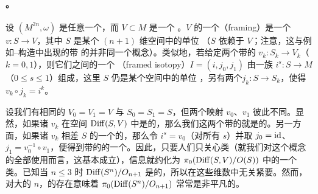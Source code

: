 \paragraph{\trFrame{}。}\label{sub:framings}
设 $(M^{2n},\omega)$ 是任意一个\trSymplectic\trManifold，而 $V\subset M$ 是一个%
\trLagrange\trSphere{}。$V$ 的一个\textbf{\trFrame}（framing）是一个%
\trDiffeomorphism{}$v\colon S\to V$，其中 $S$ 是某个 $(n+1)$ 维\trInnerProduct{}空间中的单位%
\trSphere{}（$S$ 依赖于 $V$；注意，这与例如\trPontryagin--\trThom{}构造中出现的带%
\trFrame{}的\trManifold{}并非同一个概念）。类似地，若给定两个带\trFrame{}的%
\trLagrange\trSphere{}$v_k\colon S_k\to V_k$（$k=0,1$），则它们之间的一个%
\textbf{\trFrame\trIsotopy}（framed isotopy）$I=(i,j_0,j_1)$ 由一族\trLagrange\trEmbedding{}%
$i^s\colon S\to M$（$0\le s\le 1$）组成，这里 $S$ 仍是某个\trInnerProduct{}空间中的单位%
\trSphere{}，另有两个\trIsometry{}$j_k\colon S\to S_k$，使得 $v_k\circ j_k=i^k$。
\begin{remark}\label{thm:framing-pi-zero-reduction}
设我们有相同的 $V_0=V_1=V$ 与 $S_0=S_1=S$，但两个映射 $v_0$、$v_1$ 彼此不同。显然，如果诸 $v_k$ 在\trDiffeomorphism{}空间 $\operatorname{Diff}(S,V)$ 中是\trIsotopy{}的，那么我们这两个带\trFrame{}的\trLagrange\trSphere{}就是\trIsotopy{}的。另一方面，如果诸 $v_k$ 相差 $S$ 的一个\trOrientationReversing{}的\trIsometry{}，那么令 $i^s=v_0$（对所有 $s$）并取 $j_0=\mathrm{id}$、$j_1=v_0^{-1}\circ v_1$，便得到带\trFrame{}的\trLagrange\trSphere{}的一个\trIsotopy。因此，只要人们只关心\trIsotopy{}类（就我们对这个概念的全部使用而言，这基本成立），\trFrame{}信息就约化为 $\pi_0(\operatorname{Diff}(S,V)/O(S))$ 中的一个类。已知当 $n\le 3$ 时 $\operatorname{Diff}(S^n)/O_{n+1}$ 是\trContractible{}的，所以在这些维数中\trFrame{}无关紧要。然而，对大的 $n$，\trExoticSphere{}的存在意味着 $\pi_0(\operatorname{Diff}(S^n)/O_{n+1})$ 常常是非平凡的。
\end{remark}
